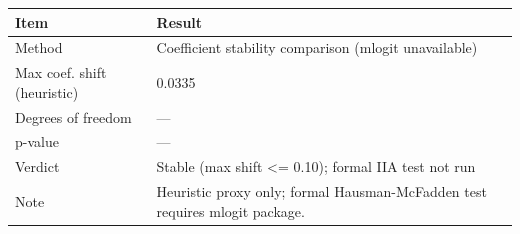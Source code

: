 
\begin{tabular}[t]{ll}
\toprule
Item & Result\\
\midrule
Method & Coefficient stability comparison (mlogit unavailable)\\
Max coef. shift (heuristic) & 0.0335\\
Degrees of freedom & —\\
p-value & —\\
Verdict & Stable (max shift <= 0.10); formal IIA test not run\\
Note & Heuristic proxy only; formal Hausman-McFadden test requires mlogit package.\\
\bottomrule
\end{tabular}
